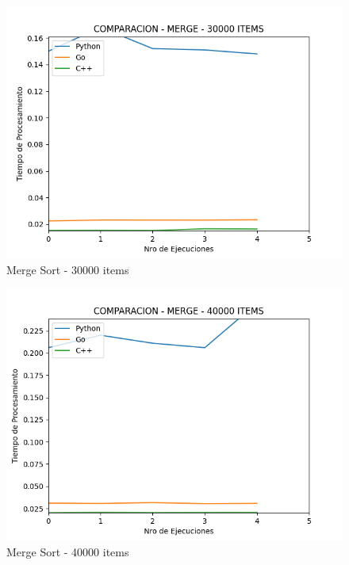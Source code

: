 \documentclass[12pt]{article} %
\begin{document}
    \begin{figure}[H]
    \centering
    \includegraphics[width=\textwidth]{merge_30000}
    \caption{Merge Sort - 30000 items}
    \end{figure}

    \vspace{5mm}
    
    \begin{figure}[H]
    \centering
    \includegraphics[width=\textwidth]{merge_40000}
    \caption{Merge Sort - 40000 items}
    \end{figure}

    \vspace{5mm}
    
\end{document}
